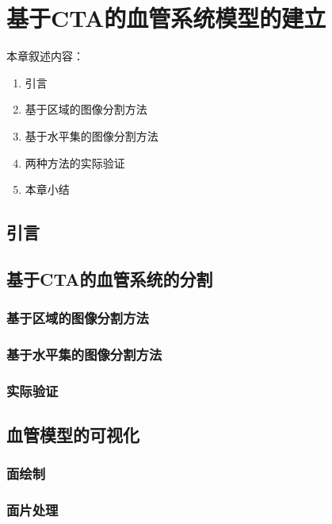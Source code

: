 \chapter{基于CTA的血管系统模型的建立}
\label{chap3} \fontsize{12pt}{12pt}\selectfont

本章叙述内容：
\begin{enumerate}
  \item 引言
  \item 基于区域的图像分割方法
  \item 基于水平集的图像分割方法
  \item 两种方法的实际验证
  \item 本章小结
\end{enumerate}

\section{引言}

\section{基于CTA的血管系统的分割}

\subsection{基于区域的图像分割方法}

\subsection{基于水平集的图像分割方法}

\subsection{实际验证}

\section{血管模型的可视化}

\subsection{面绘制}

\subsection{面片处理}

